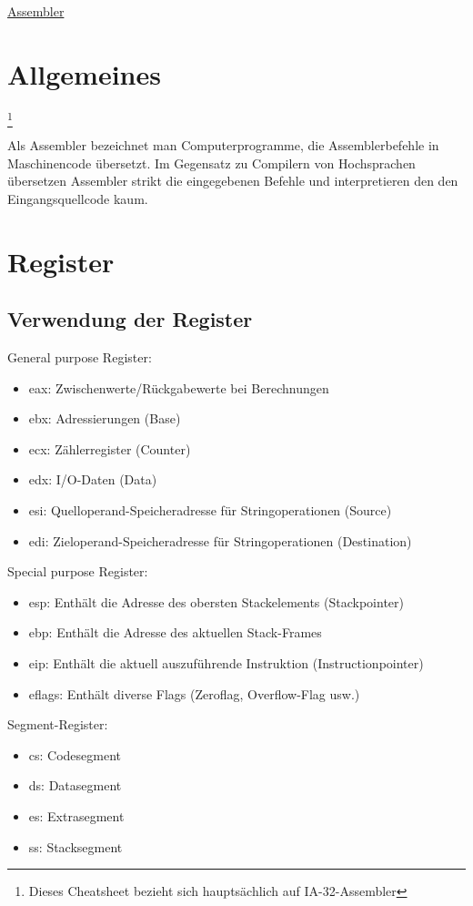 \raggedright
\footnotesize
\begin{multicols}{3}	
	\setlength{\premulticols}{1pt}
	\setlength{\postmulticols}{1pt}
	\setlength{\multicolsep}{1pt}
	\setlength{\columnsep}{2pt}

\begin{center}
     \Large{\underline{Assembler}} \\
\end{center}

\section{Allgemeines}\footnote{Dieses Cheatsheet bezieht sich hauptsächlich auf IA-32-Assembler}

Als Assembler bezeichnet man Computerprogramme, die Assemblerbefehle in Maschinencode übersetzt. Im Gegensatz zu Compilern von Hochsprachen übersetzen Assembler strikt die eingegebenen Befehle und interpretieren den den Eingangsquellcode kaum.
\section{Register}
\subsection{Verwendung der Register}
General purpose Register:
\begin{itemize}
\item eax: Zwischenwerte/Rückgabewerte bei Berechnungen
\item ebx: Adressierungen (Base)
\item ecx: Zählerregister (Counter)
\item edx: I/O-Daten (Data)
\item esi: Quelloperand-Speicheradresse für Stringoperationen (Source)
\item edi: Zieloperand-Speicheradresse für Stringoperationen (Destination)
\end{itemize}
Special purpose Register:
\begin{itemize}
\item esp: Enthält die Adresse des obersten Stackelements (Stackpointer)
\item ebp: Enthält die Adresse des aktuellen Stack-Frames
\item eip: Enthält die aktuell auszuführende Instruktion (Instructionpointer)
\item eflags: Enthält diverse Flags (Zeroflag, Overflow-Flag usw.)
\end{itemize}
Segment-Register:
\begin{itemize}
\item cs: Codesegment
\item ds: Datasegment
\item es: Extrasegment
\item ss: Stacksegment
\end{itemize}

\end{multicols}
